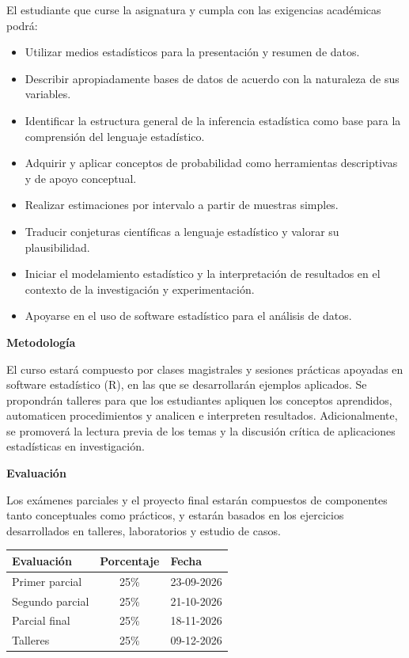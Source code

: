 \documentclass[12pt]{article}
\begin{document}
El estudiante que curse la asignatura y cumpla con las exigencias académicas podrá:
\begin{itemize}
    \item Utilizar medios estadísticos para la presentación y resumen de datos.
    \item Describir apropiadamente bases de datos de acuerdo con la naturaleza de sus variables.
    \item Identificar la estructura general de la inferencia estadística como base para la comprensión del lenguaje estadístico.
    \item Adquirir y aplicar conceptos de probabilidad como herramientas descriptivas y de apoyo conceptual.
    \item Realizar estimaciones por intervalo a partir de muestras simples.
    \item Traducir conjeturas científicas a lenguaje estadístico y valorar su plausibilidad.
    \item Iniciar el modelamiento estadístico y la interpretación de resultados en el contexto de la investigación y experimentación.
    \item Apoyarse en el uso de software estadístico para el análisis de datos.
\end{itemize}

\vspace{1em}

\textbf{\large Metodología}

El curso estará compuesto por clases magistrales y sesiones prácticas apoyadas en software estadístico (R), en las que se desarrollarán ejemplos aplicados. Se propondrán talleres para que los estudiantes apliquen los conceptos aprendidos, automaticen procedimientos y analicen e interpreten resultados. Adicionalmente, se promoverá la lectura previa de los temas y la discusión crítica de aplicaciones estadísticas en investigación.

\vspace{1em}

\textbf{\large Evaluación}

Los exámenes parciales y el proyecto final estarán compuestos de componentes tanto conceptuales como prácticos, y estarán basados en los ejercicios desarrollados en talleres, laboratorios y estudio de casos.

\begin{table}[h]
\centering
\begin{tabular}{l c l}
\hline
\textbf{Evaluación} & \textbf{Porcentaje} & \textbf{Fecha} \\
\hline
Primer parcial & 25\% & 23-09-2026 \\
Segundo parcial & 25\% & 21-10-2026 \\
Parcial final & 25\% & 18-11-2026 \\
Talleres & 25\% & 09-12-2026 \\
\hline
\end{tabular}
\end{table}
\end{document}
